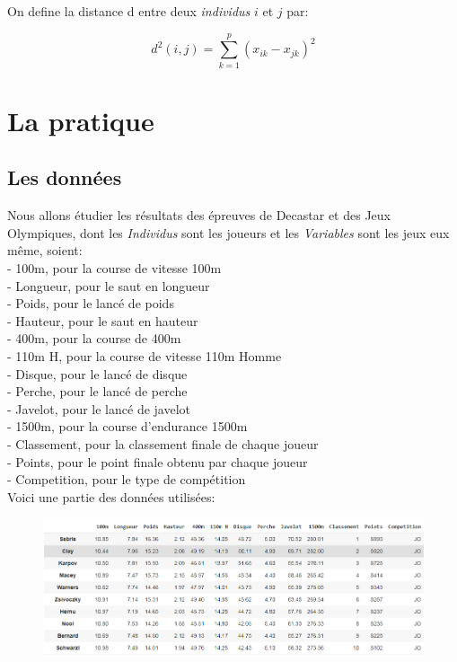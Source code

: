 \documentclass{article}
\begin{document}
On define la distance d entre deux \textit{individus} $i$ et $j$ par:

\begin{equation*}
d^2(i,j)=\sum_{k=1}^{p}{(x_{ik}-x_{jk})^2} 
\end{equation*}




\newpage

\section{La pratique}

\subsection{Les données}

Nous allons étudier les résultats des épreuves de Decastar et des Jeux Olympiques, dont les \textit{Individus} sont les joueurs et les \textit{Variables} sont les jeux eux même, soient:
\newline
\\
- 100m, pour la course de vitesse 100m \\
- Longueur, pour le saut en longueur \\
- Poids, pour le lancé de poids \\
- Hauteur, pour le saut en hauteur \\
- 400m, pour la course de 400m \\
- 110m H, pour la course de vitesse 110m Homme \\
- Disque, pour le lancé de disque \\
- Perche, pour le lancé de perche \\
- Javelot, pour le lancé de javelot \\
- 1500m, pour la course d'endurance 1500m \\
- Classement, pour la classement finale de chaque joueur \\
- Points, pour le point finale obtenu par chaque joueur \\
- Competition, pour le type de compétition \\

Voici une partie des données utilisées:

\begin{figure}[h!]
\includegraphics[width=\linewidth]{images/data_initials.png}
\end{figure}
\end{document}
